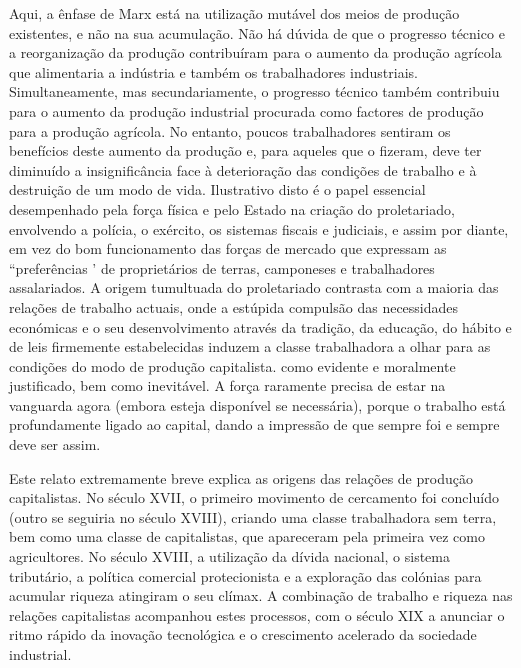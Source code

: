 Aqui, a ênfase de Marx está na utilização mutável dos meios de produção existentes, e não na sua acumulação. Não há dúvida de que o progresso técnico e a reorganização da produção contribuíram para o aumento da produção agrícola que alimentaria a indústria e também os trabalhadores industriais. Simultaneamente, mas secundariamente, o progresso técnico também contribuiu para o aumento da produção industrial procurada como factores de produção para a produção agrícola. No entanto, poucos trabalhadores sentiram os benefícios deste aumento da produção e, para aqueles que o fizeram, deve ter diminuído a insignificância face à deterioração das condições de trabalho e à destruição de um modo de vida. Ilustrativo disto é o papel essencial desempenhado pela força física e pelo Estado na criação do proletariado, envolvendo a polícia, o exército, os sistemas fiscais e judiciais, e assim por diante, em vez do bom funcionamento das forças de mercado que expressam as “preferências ' de proprietários de terras, camponeses e trabalhadores assalariados. A origem tumultuada do proletariado contrasta com a maioria das relações de trabalho actuais, onde a estúpida compulsão das necessidades económicas e o seu desenvolvimento através da tradição, da educação, do hábito e de leis firmemente estabelecidas induzem a classe trabalhadora a olhar para as condições do modo de produção capitalista. como evidente e moralmente justificado, bem como inevitável. A força raramente precisa de estar na vanguarda agora (embora esteja disponível se necessária), porque o trabalho está profundamente ligado ao capital, dando a impressão de que sempre foi e sempre deve ser assim.
 \par 
Este relato extremamente breve explica as origens das relações de produção capitalistas. No século XVII, o primeiro movimento de cercamento foi concluído (outro se seguiria no século XVIII), criando uma classe trabalhadora sem terra, bem como uma classe de capitalistas, que apareceram pela primeira vez como agricultores. No século XVIII, a utilização da dívida nacional, o sistema tributário, a política comercial protecionista e a exploração das colónias para acumular riqueza atingiram o seu clímax. A combinação de trabalho e riqueza nas relações capitalistas acompanhou estes processos, com o século XIX a anunciar o ritmo rápido da inovação tecnológica e o crescimento acelerado da sociedade industrial.
 \par 
